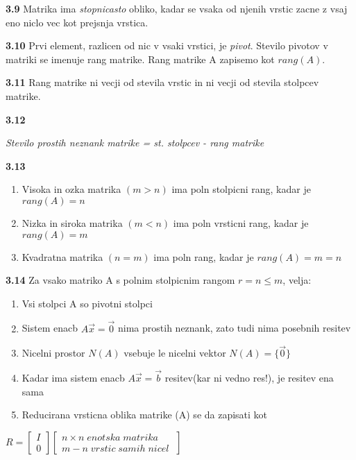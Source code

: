\documentclass{article}
\begin{document}
\begin{multicols}{3}
\textbf{3.9} Matrika ima \textit{stopnicasto} obliko, kadar se vsaka od njenih vrstic zacne z vsaj eno
niclo vec kot prejsnja vrstica.

\textbf{3.10} Prvi element, razlicen od nic v vsaki vrstici, je \textit{pivot}. Stevilo pivotov v matriki
se imenuje rang matrike. Rang matrike A zapisemo kot $rang(A)$.

\textbf{3.11} Rang matrike ni vecji od stevila vrstic in ni vecji od stevila stolpcev matrike.

\textbf{3.12}
\begin{center}
    \textit{Stevilo prostih neznank matrike = st. stolpcev - rang matrike}   
\end{center}

\textbf{3.13}
\begin{enumerate}
    \item Visoka in ozka matrika $(m > n)$ ima poln stolpicni rang, kadar je $rang(A) = n$
    \item Nizka in siroka matrika $(m < n)$ ima poln vrsticni rang, kadar je $rang(A) = m$
    \item Kvadratna matrika $(n = m)$ ima poln rang, kadar je $rang(A) = m = n$
\end{enumerate}

\textbf{3.14} Za vsako matriko A s polnim stolpicnim rangom $r = n \leq m$, velja:
\begin{enumerate}
    \item Vsi stolpci A so pivotni stolpci
    \item Sistem enacb $A\vec{x} = \vec{0}$ nima prostih neznank, zato tudi nima posebnih resitev
    \item Nicelni prostor $N(A)$ vsebuje le nicelni vektor $N(A) = \{\vec{0}\}$
    \item Kadar ima sistem enacb $A\vec{x} = \vec{b}$ resitev(kar ni vedno res!), je resitev ena sama
    \item Reducirana vrsticna oblika matrike (A) se da zapisati kot
\end{enumerate}
\begin{center}
    $R =
    \begin{bmatrix}
        I\\
        0
    \end{bmatrix}
    \begin{bmatrix}
        n \times n\; enotska\; matrika\\
        m - n\; vrstic\; samih\; nicel\;
    \end{bmatrix}
    $
\end{center}


\end{multicols}
\end{document}
